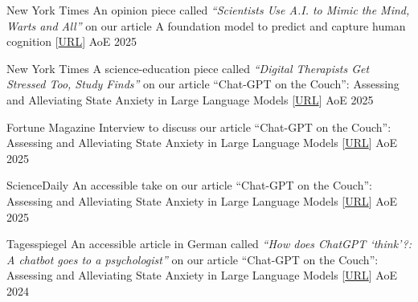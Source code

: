 
\begin{cvhonors}


    \cvhonor
    {New York Times} %
    {An opinion piece called \textit{“Scientists Use A.I. to Mimic the Mind, Warts and All”} on our article A foundation model to predict and capture human cognition [\href{https://www.nytimes.com/2025/07/02/science/ai-psychology-mind.html}{URL}]} %
    {AoE} %
    {2025} %

   \cvhonor
    {New York Times} %
    {A science-education piece called \textit{“Digital Therapists Get Stressed Too, Study Finds”} on our article “Chat-GPT on the Couch”: Assessing and Alleviating State Anxiety in Large Language Models [\href{https://www.nytimes.com/2025/03/17/science/chatgpt-digital-therapists-anxiety.html}{URL}]} %
    {AoE} %
    {2025} %

   \cvhonor
    {Fortune Magazine} %
    {Interview to discuss our article “Chat-GPT on the Couch”: Assessing and Alleviating State Anxiety in Large Language Models [\href{https://fortune.com/2025/03/09/openai-chatgpt-anxiety-mindfulness-mental-health-intervention/}{URL}]} %
    {AoE} %
    {2025} %
    
  \cvhonor
    {ScienceDaily} %
    {An accessible take on our article “Chat-GPT on the Couch”: Assessing and Alleviating State Anxiety in Large Language Models [\href{https://www.sciencedaily.com/releases/2025/03/250303141645.htm}{URL}]} %
    {AoE} %
    {2025} %

\cvhonor
    {Tagesspiegel} %
    {An accessible article in German called \textit{“How does ChatGPT ‘think’?: A chatbot goes to a psychologist”} on our article “Chat-GPT on the Couch”: Assessing and Alleviating State Anxiety in Large Language Models [\href{https://www.tagesspiegel.de/wissen/wie-denkt-chatgpt-geht-ein-chatbot-zum-psychologen-11726375.html}{URL}]} %
    {AoE} %
    {2024} %
    \vspace{3mm}
\end{cvhonors}

